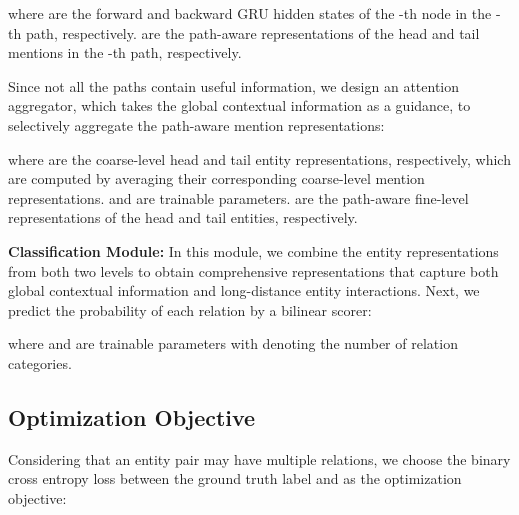 \documentclass[letterpaper]{article} \usepackage{aaai21}  \usepackage{times}  \usepackage{helvet} \usepackage{courier}  \usepackage[hyphens]{url}  \usepackage{graphicx} \urlstyle{rm} \def\UrlFont{\rm}  \usepackage{natbib}  \usepackage{caption} \frenchspacing  \setlength{\pdfpagewidth}{8.5in}  \setlength{\pdfpageheight}{11in}
\begin{document}
where  are the forward and backward GRU hidden states of the -th node in the -th path, respectively. 
 are the path-aware representations of the head and tail mentions in the -th path, respectively. 

Since not all the paths contain useful information, we design an attention aggregator, which takes the global contextual information as a guidance, to selectively aggregate the path-aware mention representations: 

where  are the coarse-level head and tail entity representations, respectively, which are computed by averaging their corresponding coarse-level mention representations. 
 and  are trainable parameters. 
 are the path-aware fine-level representations of the head and tail entities, respectively. 

\noindent\textbf{Classification Module:}
In this module, we combine the entity representations from both two levels to obtain comprehensive representations that capture both global contextual information and long-distance entity interactions. 
Next, we predict the probability of each relation by a bilinear scorer: 

where  and   are trainable parameters with  denoting the number of relation categories. 

\subsection{Optimization Objective}
Considering that an entity pair may have multiple relations, we choose the binary cross entropy loss between the ground truth label  and  as the optimization objective: 
\end{document}

